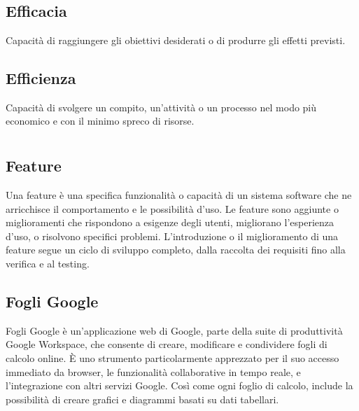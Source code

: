 \section{}

\hypertarget{sec:efficacia}{}
\subsection*{Efficacia}
Capacità di raggiungere gli obiettivi desiderati o di produrre gli effetti previsti.

\hypertarget{sec:efficienza}{}
\subsection*{Efficienza}
Capacità di svolgere un compito, un'attività o un processo nel modo più economico e con il minimo spreco di risorse.

\newpage



\section{}

\hypertarget{sec:feature}{}
\subsection*{Feature}
Una feature è una specifica funzionalità o capacità di un sistema software che ne arricchisce il comportamento e le possibilità d'uso. Le feature sono 
aggiunte o miglioramenti che rispondono a esigenze degli utenti, migliorano l’esperienza d’uso, o risolvono specifici problemi. L'introduzione o il 
miglioramento di una feature segue un ciclo di sviluppo completo, dalla raccolta dei requisiti fino alla verifica e al testing.

\subsection*{Fogli Google}
Fogli Google è un'applicazione web di Google, parte della suite di produttività Google Workspace, che consente di creare, modificare e condividere fogli 
di calcolo online. È uno strumento particolarmente apprezzato per il suo accesso immediato da browser, le funzionalità collaborative in tempo reale, e 
l'integrazione con altri servizi Google. Così come ogni foglio di calcolo, include la possibilità di creare grafici e diagrammi basati su dati tabellari.

\newpage